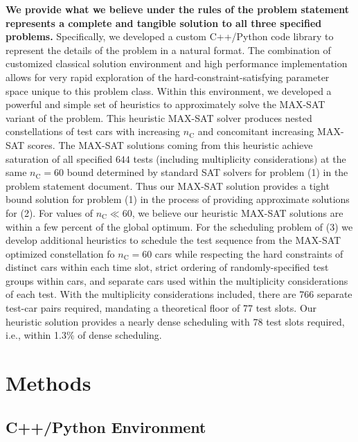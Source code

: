 \documentclass[aps,prl,twocolumn,superscriptaddress,groupedaddress]{revtex4}  %
\begin{document}
\textbf{We provide what we believe under the rules of the problem statement
represents a complete and tangible solution to all three specified problems.}
Specifically, we developed a custom C++/Python code library to represent the
details of the problem in a natural format. 
The combination of customized classical solution environment and high
performance implementation allows for very rapid exploration of the
hard-constraint-satisfying parameter space unique to this problem class.  Within
this environment, we developed a powerful and simple set of heuristics to
approximately solve the MAX-SAT variant of the problem. This heuristic MAX-SAT
solver produces nested constellations of test cars with increasing
$n_{\mathrm{C}}$ and concomitant increasing MAX-SAT scores. The MAX-SAT
solutions coming from this heuristic achieve saturation of all specified $644$
tests (including multiplicity considerations) at the same $n_{\mathrm{C}} = 60$
bound determined by standard SAT solvers for problem (1) in the problem
statement document. Thus our MAX-SAT solution provides a tight bound solution
for problem (1) in the process of providing approximate solutions for (2). For
values of $n_{\mathrm{C}} \ll 60$, we believe our heuristic MAX-SAT solutions
are within a few percent of the global optimum. For the scheduling problem of
(3) we develop additional heuristics to schedule the test sequence from the
MAX-SAT optimized constellation fo $n_{\mathrm{C}} = 60$ cars while respecting
the hard constraints of distinct cars within each time slot, strict ordering of
randomly-specified test groups within cars, and separate cars used within the
multiplicity considerations of each test. With the multiplicity considerations
included, there are 766 separate test-car pairs required, mandating a
theoretical floor of 77 test slots. Our heuristic solution provides a nearly
dense scheduling with 78 test slots required, i.e., within 1.3$\%$ of dense
scheduling.

\section{Methods}

\subsection{C++/Python Environment}
\end{document}
